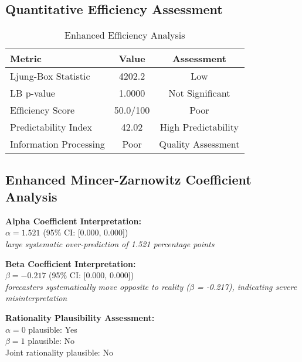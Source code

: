 \documentclass[11pt,a4paper]{article}
\begin{document}
\subsection{Quantitative Efficiency Assessment}
\begin{table}[H]
  \centering
  \caption{Enhanced Efficiency Analysis}
  \begin{tabular}{lcc}
    \toprule
    \textbf{Metric}        & \textbf{Value} & \textbf{Assessment} \\
    \midrule
    Ljung-Box Statistic    & 4202.2         & Low                 \\
    LB p-value             & 1.0000         & Not Significant     \\
    Efficiency Score       & 50.0/100       & Poor                \\
    Predictability Index   & 42.02          & High Predictability \\
    Information Processing & Poor           & Quality Assessment  \\
    \bottomrule
  \end{tabular}
\end{table}

\subsection{Enhanced Mincer-Zarnowitz Coefficient Analysis}
\textbf{Alpha Coefficient Interpretation:}\\
$\alpha = 1.521$ (95\% CI: [0.000, 0.000])\\
\textit{large systematic over-prediction of 1.521 percentage points}

\textbf{Beta Coefficient Interpretation:}\\
$\beta = -0.217$ (95\% CI: [0.000, 0.000])\\
\textit{forecasters systematically move opposite to reality ($\beta$ = -0.217), indicating severe misinterpretation}

\textbf{Rationality Plausibility Assessment:}\\
$\alpha = 0$ plausible: Yes\\
$\beta = 1$ plausible: No\\
Joint rationality plausible: No
\end{document}
